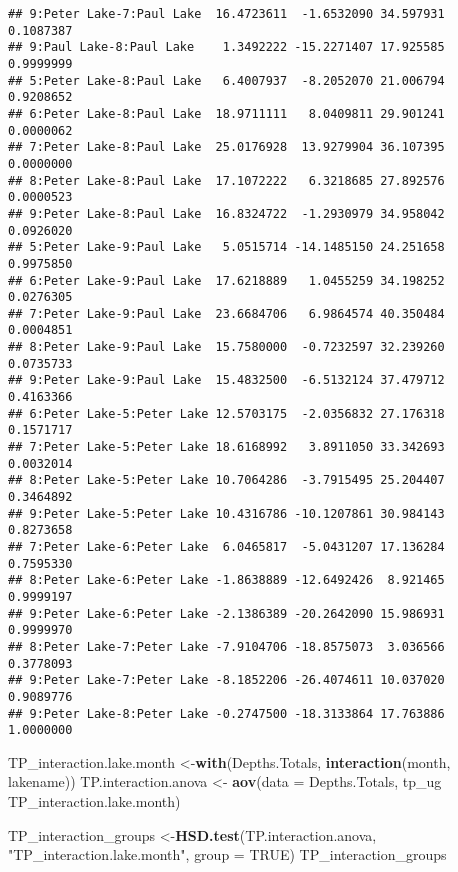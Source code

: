 \documentclass[]{article}
\newenvironment{Shaded}{\begin{snugshade}}{\end{snugshade}}
\newcommand{\DataTypeTok}[1]{\textcolor[rgb]{0.13,0.29,0.53}{#1}}
\newcommand{\KeywordTok}[1]{\textcolor[rgb]{0.13,0.29,0.53}{\textbf{#1}}}
\newcommand{\NormalTok}[1]{#1}
\newcommand{\OperatorTok}[1]{\textcolor[rgb]{0.81,0.36,0.00}{\textbf{#1}}}
\newcommand{\OtherTok}[1]{\textcolor[rgb]{0.56,0.35,0.01}{#1}}
\newcommand{\StringTok}[1]{\textcolor[rgb]{0.31,0.60,0.02}{#1}}
\begin{document}
\begin{verbatim}
## 9:Peter Lake-7:Paul Lake  16.4723611  -1.6532090 34.597931 0.1087387
## 9:Paul Lake-8:Paul Lake    1.3492222 -15.2271407 17.925585 0.9999999
## 5:Peter Lake-8:Paul Lake   6.4007937  -8.2052070 21.006794 0.9208652
## 6:Peter Lake-8:Paul Lake  18.9711111   8.0409811 29.901241 0.0000062
## 7:Peter Lake-8:Paul Lake  25.0176928  13.9279904 36.107395 0.0000000
## 8:Peter Lake-8:Paul Lake  17.1072222   6.3218685 27.892576 0.0000523
## 9:Peter Lake-8:Paul Lake  16.8324722  -1.2930979 34.958042 0.0926020
## 5:Peter Lake-9:Paul Lake   5.0515714 -14.1485150 24.251658 0.9975850
## 6:Peter Lake-9:Paul Lake  17.6218889   1.0455259 34.198252 0.0276305
## 7:Peter Lake-9:Paul Lake  23.6684706   6.9864574 40.350484 0.0004851
## 8:Peter Lake-9:Paul Lake  15.7580000  -0.7232597 32.239260 0.0735733
## 9:Peter Lake-9:Paul Lake  15.4832500  -6.5132124 37.479712 0.4163366
## 6:Peter Lake-5:Peter Lake 12.5703175  -2.0356832 27.176318 0.1571717
## 7:Peter Lake-5:Peter Lake 18.6168992   3.8911050 33.342693 0.0032014
## 8:Peter Lake-5:Peter Lake 10.7064286  -3.7915495 25.204407 0.3464892
## 9:Peter Lake-5:Peter Lake 10.4316786 -10.1207861 30.984143 0.8273658
## 7:Peter Lake-6:Peter Lake  6.0465817  -5.0431207 17.136284 0.7595330
## 8:Peter Lake-6:Peter Lake -1.8638889 -12.6492426  8.921465 0.9999197
## 9:Peter Lake-6:Peter Lake -2.1386389 -20.2642090 15.986931 0.9999970
## 8:Peter Lake-7:Peter Lake -7.9104706 -18.8575073  3.036566 0.3778093
## 9:Peter Lake-7:Peter Lake -8.1852206 -26.4074611 10.037020 0.9089776
## 9:Peter Lake-8:Peter Lake -0.2747500 -18.3133864 17.763886 1.0000000
\end{verbatim}

\begin{Shaded}
\begin{Highlighting}[]
\NormalTok{TP_interaction.lake.month <-}\KeywordTok{with}\NormalTok{(Depths.Totals, }\KeywordTok{interaction}\NormalTok{(month, lakename))}
\NormalTok{TP.interaction.anova <-}\StringTok{ }\KeywordTok{aov}\NormalTok{(}\DataTypeTok{data =}\NormalTok{ Depths.Totals, tp_ug }\OperatorTok{~}\StringTok{ }\NormalTok{TP_interaction.lake.month)}

\NormalTok{TP_interaction_groups <-}\KeywordTok{HSD.test}\NormalTok{(TP.interaction.anova, }\StringTok{"TP_interaction.lake.month"}\NormalTok{, }\DataTypeTok{group =} \OtherTok{TRUE}\NormalTok{)}
\NormalTok{TP_interaction_groups}
\end{Highlighting}
\end{Shaded}
\end{document}
